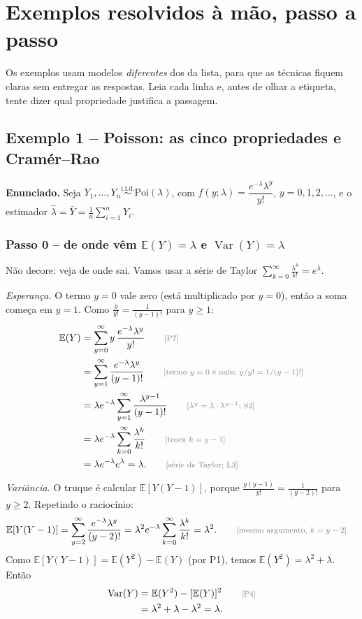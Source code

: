\documentclass[11pt,a4paper]{article}
\theoremstyle{definition}
\theoremstyle{plain}
\newcommand{\E}{\mathbb{E}}
\newcommand{\Var}{\operatorname{Var}}
\newcommand{\iid}{\overset{\text{i.i.d.}}{\sim}}
\newcommand{\bY}{\bar{Y}}
\newcommand{\just}[1]{\tag*{\footnotesize\textcolor{gray}{[#1]}}}
\begin{document}
\section{Exemplos resolvidos à mão, passo a passo}

Os exemplos usam modelos \emph{diferentes} dos da lista, para que as técnicas fiquem claras sem entregar as respostas. Leia cada linha e, antes de olhar a etiqueta, tente dizer qual propriedade justifica a passagem.

\subsection{Exemplo 1 -- Poisson: as cinco propriedades e Cramér--Rao}\label{ex:poisson}

\textbf{Enunciado.} Seja $Y_1,\dots,Y_n\iid\text{Poi}(\lambda)$, com $f(y;\lambda)=\dfrac{e^{-\lambda}\lambda^y}{y!}$, $y=0,1,2,\dots$, e o estimador $\hat\lambda=\bY=\frac1n\sum_{i=1}^nY_i$.

\subsubsection*{Passo 0 -- de onde vêm $\E(Y)=\lambda$ e $\Var(Y)=\lambda$}

Não decore: veja de onde sai. Vamos usar a série de Taylor $\sum_{k=0}^\infty\frac{\lambda^k}{k!}=e^\lambda$.

\textit{Esperança.} O termo $y=0$ vale zero (está multiplicado por $y=0$), então a soma começa em $y=1$. Como $\frac{y}{y!}=\frac{1}{(y-1)!}$ para $y\ge1$:
\begin{align*}
\E(Y)&=\sum_{y=0}^\infty y\,\frac{e^{-\lambda}\lambda^y}{y!} \just{P7}\\
&=\sum_{y=1}^\infty \frac{e^{-\lambda}\lambda^y}{(y-1)!} \just{termo $y=0$ é nulo; $y/y!=1/(y-1)!$}\\
&=\lambda e^{-\lambda}\sum_{y=1}^\infty \frac{\lambda^{y-1}}{(y-1)!} \just{$\lambda^y=\lambda\cdot\lambda^{y-1}$; S2}\\
&=\lambda e^{-\lambda}\sum_{k=0}^\infty \frac{\lambda^{k}}{k!} \just{troca $k=y-1$}\\
&=\lambda e^{-\lambda}e^{\lambda}=\lambda . \just{série de Taylor; L3}
\end{align*}

\textit{Variância.} O truque é calcular $\E[Y(Y-1)]$, porque $\frac{y(y-1)}{y!}=\frac{1}{(y-2)!}$ para $y\ge2$. Repetindo o raciocínio:
\begin{align*}
\E[Y(Y-1)]&=\sum_{y=2}^\infty \frac{e^{-\lambda}\lambda^y}{(y-2)!}
=\lambda^2e^{-\lambda}\sum_{k=0}^\infty\frac{\lambda^k}{k!}=\lambda^2 . \just{mesmo argumento, $k=y-2$}
\end{align*}
Como $\E[Y(Y-1)]=\E(Y^2)-\E(Y)$ (por P1), temos $\E(Y^2)=\lambda^2+\lambda$. Então
\begin{align*}
\Var(Y)&=\E(Y^2)-[\E(Y)]^2 \just{P4}\\
&=\lambda^2+\lambda-\lambda^2=\lambda .
\end{align*}
\end{document}
